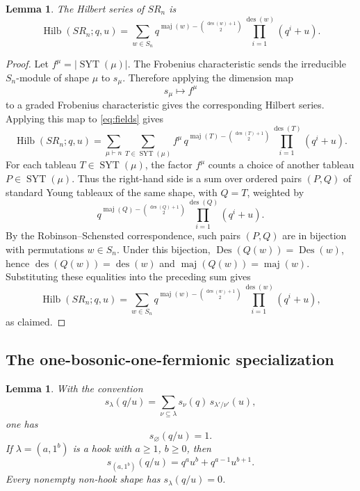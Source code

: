 \documentclass[12pt]{article}
\newtheorem{lemma}[theorem]{Lemma}
\DeclareMathOperator{\Hilb}{Hilb}
\DeclareMathOperator{\Des}{Des}
\DeclareMathOperator{\des}{des}
\DeclareMathOperator{\maj}{maj}
\newcommand{\SYT}{\operatorname{SYT}}
\begin{document}
\begin{lemma}\label{lem:permutation-hilbert}
The Hilbert series of \(SR_n\) is
\[
\Hilb(SR_n;q,u)
=
\sum_{w\in S_n}
q^{\maj(w)-\binom{\des(w)+1}{2}}
\prod_{i=1}^{\des(w)}(q^i+u).
\]
\end{lemma}

\begin{proof}
Let \(f^\mu=|\SYT(\mu)|\).  The Frobenius characteristic sends the irreducible \(S_n\)-module of shape \(\mu\) to \(s_\mu\).  Therefore applying the dimension map
\[
s_\mu\longmapsto f^\mu
\]
to a graded Frobenius characteristic gives the corresponding Hilbert series.  Applying this map to \eqref{eq:fields} gives
\[
\Hilb(SR_n;q,u)
=
\sum_{\mu\vdash n}
\sum_{T\in \SYT(\mu)}
f^\mu\,
q^{\maj(T)-\binom{\des(T)+1}{2}}
\prod_{i=1}^{\des(T)}(q^i+u).
\]
For each tableau \(T\in\SYT(\mu)\), the factor \(f^\mu\) counts a choice of another tableau \(P\in\SYT(\mu)\).  Thus the right-hand side is a sum over ordered pairs \((P,Q)\) of standard Young tableaux of the same shape, with \(Q=T\), weighted by
\[
q^{\maj(Q)-\binom{\des(Q)+1}{2}}
\prod_{i=1}^{\des(Q)}(q^i+u).
\]
By the Robinson--Schensted correspondence, such pairs \((P,Q)\) are in bijection with permutations \(w\in S_n\).  Under this bijection, \(\Des(Q(w))=\Des(w)\), hence \(\des(Q(w))=\des(w)\) and \(\maj(Q(w))=\maj(w)\).  Substituting these equalities into the preceding sum gives
\[
\Hilb(SR_n;q,u)
=
\sum_{w\in S_n}
q^{\maj(w)-\binom{\des(w)+1}{2}}
\prod_{i=1}^{\des(w)}(q^i+u),
\]
as claimed.
\end{proof}

\subsection{The one-bosonic-one-fermionic specialization}

\begin{lemma}\label{lem:super-schur}
With the convention
\[
s_\lambda(q/u)=\sum_{\nu\subseteq\lambda}s_\nu(q)\,s_{\lambda'/\nu'}(u),
\]
one has
\[
s_{\varnothing}(q/u)=1.
\]
If \(\lambda=(a,1^b)\) is a hook with \(a\ge 1\), \(b\ge 0\), then
\[
s_{(a,1^b)}(q/u)=q^a u^b+q^{a-1}u^{b+1}.
\]
Every nonempty non-hook shape has \(s_\lambda(q/u)=0\).
\end{lemma}
\end{document}
